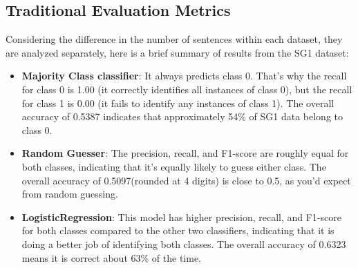 \documentclass[11pt,a4paper]{article}
\begin{document}
\subsection{Traditional Evaluation Metrics}
Considering the difference in the number of sentences within each dataset, they are analyzed separately, here is a brief summary of results from the SG1 dataset:
\begin{itemize}
    \item \textbf{Majority Class classifier}: It always predicts class 0. That’s why the recall for class 0 is 1.00 (it correctly identifies all instances of class 0), but the recall for class 1 is 0.00 (it fails to identify any instances of class 1). The overall accuracy of 0.5387 indicates that approximately 54\% of SG1 data belong to class 0.
    \item \textbf{Random Guesser}:  The precision, recall, and F1-score are roughly equal for both classes, indicating that it’s equally likely to guess either class. The overall accuracy of 0.5097(rounded at 4 digits) is close to 0.5, as you’d expect from random guessing. 
    \item \textbf{LogisticRegression}: This model has higher precision, recall, and F1-score for both classes compared to the other two classifiers, indicating that it is doing a better job of identifying both classes. The overall accuracy of 0.6323 means it is correct about 63\% of the time.
\end{itemize}
\end{document}
